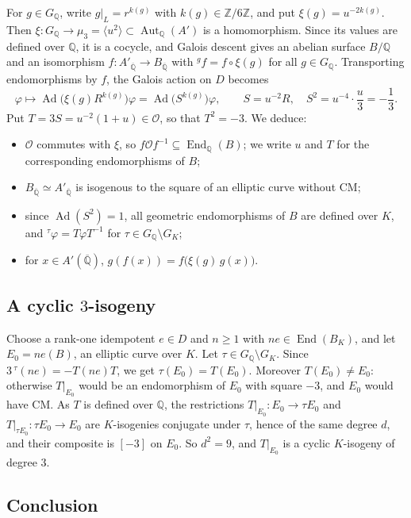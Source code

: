 \documentclass[11pt]{article}
\newcommand{\Q}{\mathbb Q}
\newcommand{\Z}{\mathbb Z}
\DeclareMathOperator{\End}{End}
\DeclareMathOperator{\Aut}{Aut}
\DeclareMathOperator{\Ad}{Ad}
\begin{document}
For \(g\in G_{\Q}\), write \(g|_L=r^{k(g)}\) with \(k(g)\in\Z/6\Z\), and
put \(\xi(g)=u^{-2k(g)}\). Then
\(\xi:G_{\Q}\to\mu_3=\langle u^2\rangle\subset\Aut_{\Q}(A')\) is a
homomorphism. Since its values are defined over \(\Q\), it is a
cocycle, and Galois descent gives an abelian surface \(B/\Q\) and an
isomorphism \(f:A'_{\overline{\Q}}\to B_{\overline{\Q}}\) with
\({}^gf=f\circ\xi(g)\) for all \(g\in G_{\Q}\). Transporting
endomorphisms by \(f\), the Galois action on \(D\) becomes
\[
 \varphi\longmapsto\Ad\bigl(\xi(g)R^{k(g)}\bigr)\varphi
 =\Ad\bigl(S^{k(g)}\bigr)\varphi,\qquad
 S=u^{-2}R,\quad S^2=u^{-4}\cdot\frac u3=-\frac13 .
\]
Put \(T=3S=u^{-2}(1+u)\in\mathcal O\), so that \(T^2=-3\). We deduce:
\begin{itemize}
\item \(\mathcal O\) commutes with \(\xi\), so
\(f\mathcal Of^{-1}\subseteq\End_{\Q}(B)\); we write \(u\) and \(T\)
for the corresponding endomorphisms of \(B\);
\item \(B_{\overline{\Q}}\simeq A'_{\overline{\Q}}\) is isogenous to the
square of an elliptic curve without CM;
\item since \(\Ad(S^2)=1\), all geometric endomorphisms of \(B\) are
defined over \(K\), and \({}^\tau\varphi=T\varphi T^{-1}\) for
\(\tau\in G_{\Q}\setminus G_K\);
\item for \(x\in A'(\overline{\Q})\),
\(g(f(x))=f\bigl(\xi(g)\,g(x)\bigr)\).
\end{itemize}

\subsection{A cyclic \texorpdfstring{\(3\)}{3}-isogeny}\label{sec:isogeny}

Choose a rank-one idempotent \(e\in D\) and \(n\geq1\) with
\(ne\in\End(B_K)\), and let \(E_0=ne(B)\), an elliptic curve over \(K\).
Let \(\tau\in G_{\Q}\setminus G_K\). Since
\(3\,{}^\tau(ne)=-T(ne)T\), we get \(\tau(E_0)=T(E_0)\). Moreover
\(T(E_0)\neq E_0\): otherwise \(T|_{E_0}\) would be an endomorphism of
\(E_0\) with square \(-3\), and \(E_0\) would have CM. As \(T\) is
defined over \(\Q\), the restrictions \(T|_{E_0}:E_0\to\tau E_0\) and
\(T|_{\tau E_0}:\tau E_0\to E_0\) are \(K\)-isogenies conjugate under
\(\tau\), hence of the same degree \(d\), and their composite is
\([-3]\) on \(E_0\). So \(d^2=9\), and \(T|_{E_0}\) is a cyclic
\(K\)-isogeny of degree \(3\).

\subsection{Conclusion}
\end{document}
